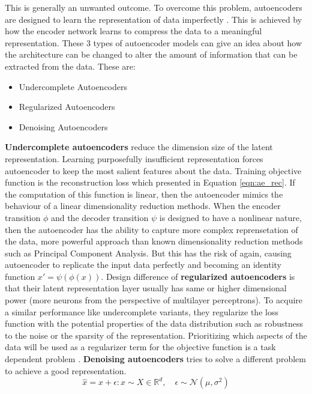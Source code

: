 {This is generally an unwanted outcome. To overcome this problem, autoencoders are designed to learn the
representation of data imperfectly \cite{Goodfellow-et-al-2016}. This is achieved by how the
encoder network learns to compress the data to a meaningful representation. These 3 types of
autoencoder models can give an idea about how the architecture can be changed to alter the amount of
information that can be extracted from the data. These are:

\begin{itemize}
    \item Undercomplete Autoencoders
    \item Regularized Autoencoders
    \item Denoising Autoencoders
\end{itemize}

\textbf{Undercomplete autoencoders} reduce the dimension size of the latent representation. Learning
purposefully insufficient representation forces autoencoder to keep the most salient features about
the data. Training objective function is the reconstruction loss which presented in Equation
\ref{eqn:ae_rec}. If the computation of this function is linear, then the autoencoder mimics the
behaviour of a linear dimensionality reduction methods. When the encoder transition $\phi$ and the
decoder transition $\psi$ is designed to have a nonlinear nature, then the autoencoder has the
ability to capture more complex reprensetation of the data, more powerful approach than known dimensionality 
reduction methods such as Principal Component Analysis. But this has the risk of again, causing 
autoencoder to replicate the input data perfectly and becoming an identity function $x' = \psi(\phi(x))$. 
 Design difference of \textbf{regularized autoencoders} is that their latent representation layer usually has same 
or higher dimensional power (more neurons from the perspective of multilayer perceptrons). 
To acquire a similar performance like undercomplete variants, they regularize the loss function  
with the potential properties of the data distribution such as robustness to the noise or the 
sparsity of the representation. Prioritizing which aspects of the data will be used as a regularizer 
term for the objective function is a task dependent problem \cite{Goodfellow-et-al-2016}. 
\textbf{Denoising autoencoders} tries to solve a different problem to achieve a good representation. 
$$
\hat{x} = x + \epsilon : x \sim X \in \mathbb{R}^d ,\quad \epsilon \sim \mathcal{N}(\mu, \sigma^2)
$$

}
